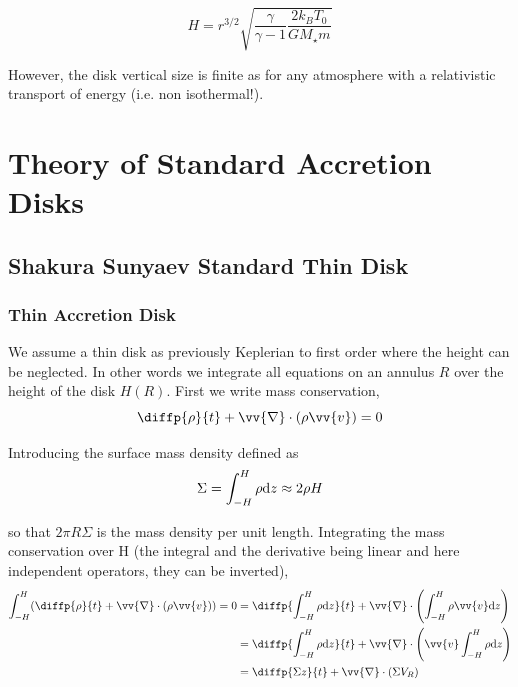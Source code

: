 \documentclass[10pt,a4paper,english]{article}
\let\originalleft\left
\let\originalright\right
\renewcommand{\left}{\mathopen{}\mathclose\bgroup\originalleft}
\renewcommand{\right}{\aftergroup\egroup\originalright}
\begin{document}
\begin{equation}
H = r^{3/2} \sqrt{\frac{\gamma}{\gamma-1}\frac{2 k_B T_0}{G M_\star m}}
\end{equation}

However, the disk vertical size is finite as for any atmosphere with a relativistic transport of energy (i.e. non isothermal!).

\section{Theory of Standard Accretion Disks}

\subsection{Shakura Sunyaev Standard Thin Disk}

\subsubsection{Thin Accretion Disk}


We assume a thin disk as previously Keplerian to first order where the height
can be neglected. In other words we integrate all equations on an annulus $R$
over the height of the disk $H(R)$. First we write mass conservation,
\begin{equation*}
    \diffp{\rho}{t} + \vv{\nabla}\cdot(\rho \vv{v}) = 0
\end{equation*}

Introducing the surface mass density defined as
\begin{equation*}
    \Sigma = \int_{-H}^H \rho \mathrm{d}{z} \approx 2 \rho H
\end{equation*}

so that $2 \pi R \Sigma$ is the mass density per unit length. Integrating the
mass conservation over H (the integral and the derivative being linear and here
independent operators, they can be inverted),
\begin{align*}
    \int_{-H}^H \left( \diffp{\rho}{t} + \vv{\nabla}\cdot(\rho \vv{v}) \right) = 0 %
    &= \diffp{\int_{-H}^H \rho \d{z}}{t} + \vv{\nabla}\cdot\left( \int_{-H}^H \rho \vv{v} \d{z} \right) \\
    &= \diffp{\int_{-H}^H \rho \d{z}}{t} + \vv{\nabla}\cdot\left( \vv{v} \int_{-H}^H \rho \d{z} \right) \\
    &= \diffp{\Sigma z}{t} + \vv{\nabla}\cdot(\Sigma V_R)
\end{align*}
\end{document}
